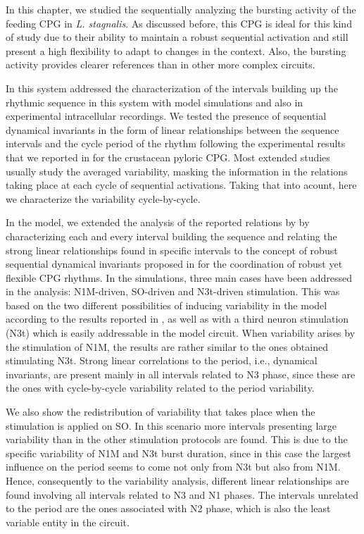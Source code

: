 In this chapter, we studied the sequentially analyzing the bursting activity of the feeding CPG in \textit{L. stagnalis}. As discussed before, this CPG is ideal for this kind of study due to their ability to maintain a robust sequential activation and still present a high flexibility to adapt to changes in the context. Also, the bursting activity provides clearer references than in other more complex circuits. 

In this system addressed the characterization of the intervals building up the rhythmic sequence in this system with model simulations and also in experimental intracellular recordings. We tested the presence of sequential dynamical invariants in the form of linear relationships between the sequence intervals and the cycle period of the rhythm following the experimental results that we reported in \cite{elices_robust_2019} for the crustacean pyloric CPG. Most extended studies usually study the averaged variability, masking the information in the relations taking place at each cycle of sequential activations. Taking that into acount, here we characterize the variability cycle-by-cycle. 

In the model, we extended the analysis of the reported relations by \cite{Elliott1991} by characterizing each and every interval building the sequence and relating the strong linear relationships found in specific intervals to the concept of robust sequential dynamical invariants proposed in \cite{elices_robust_2019} for the coordination of robust yet flexible CPG rhythms. In the simulations, three main cases have been addressed in the analysis: N1M-driven, SO-driven and N3t-driven stimulation. This was based on the two different possibilities of inducing variability in the model according to the results reported in \cite{vavoulis_dynamic_2007}, as well as with a third neuron stimulation (N3t) which is easily addressable in the model circuit. When variability arises by the stimulation of N1M, the results are rather similar to the ones obtained stimulating N3t. Strong linear correlations to the period, i.e.,  dynamical invariants, are present mainly in all intervals related to N3 phase, since these are the ones with cycle-by-cycle variability related to the period variability.  

We also show the redistribution of variability that takes place when the stimulation is applied on SO. In this scenario more intervals presenting large variability than in the other stimulation protocols are found. This is due to the specific variability of N1M and N3t burst duration, since in this case the largest influence on the period seems to come not only from N3t but also from N1M. Hence, consequently to the variability analysis, different linear relationships are found involving all intervals related to N3 and N1 phases. The intervals unrelated to the period are the ones associated with N2 phase, which is also the least variable entity in the circuit. 

